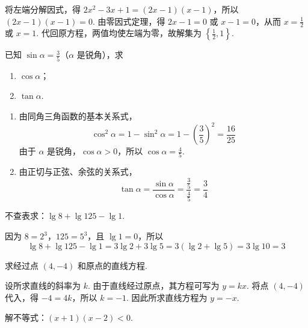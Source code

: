 \begin{solution}
将左端分解因式，得 \(2x^{2}-3x+1=\left(2x-1\right)\left(x-1\right)\)，所以 \(\left(2x-1\right)\left(x-1\right)=0\). 由零因式定理，得 \(2x-1=0\) 或 \(x-1=0\)，从而 \(x=\frac{1}{2}\) 或 \(x=1\). 代回原方程，两值均使左端为零，故解集为 \(\left\{\frac{1}{2},1\right\}\).
\end{solution}

\begin{problem}
已知 \(\sin\alpha=\frac{3}{5}\)（\(\alpha\) 是锐角），求

\begin{enumerate}
\item \(\cos\alpha\)；
\item \(\tan\alpha\).
\end{enumerate}
\end{problem}

\begin{solution}
\begin{enumerate}
\item 由同角三角函数的基本关系式，
\[
\cos^{2}\alpha=1-\sin^{2}\alpha=1-\left(\frac{3}{5}\right)^{2}=\frac{16}{25}
\]
由于 \(\alpha\) 是锐角，\(\cos\alpha>0\)，所以 \(\cos\alpha=\frac{4}{5}\).

\item 由正切与正弦、余弦的关系式，
\[
\tan\alpha=\frac{\sin\alpha}{\cos\alpha}=\frac{\frac{3}{5}}{\frac{4}{5}}=\frac{3}{4}
\]
\end{enumerate}
\end{solution}

\begin{problem}
不查表求：\(\lg 8+\lg 125-\lg 1\).
\end{problem}

\begin{solution}
因为 \(8=2^{3}\)，\(125=5^{3}\)，且 \(\lg1=0\)，所以
\[
\lg8+\lg125-\lg1=3\lg2+3\lg5=3\left(\lg2+\lg5\right)=3\lg10=3
\]
\end{solution}

\begin{problem}
求经过点 \((4,-4)\) 和原点的直线方程.
\end{problem}

\begin{solution}
设所求直线的斜率为 \(k\). 由于直线经过原点，其方程可写为 \(y=kx\). 将点 \((4,-4)\) 代入，得 \(-4=4k\)，所以 \(k=-1\). 因此所求直线方程为 \(y=-x\).
\end{solution}

\begin{problem}
解不等式：\(\left(x+1\right)\left(x-2\right)<0\).
\end{problem}

